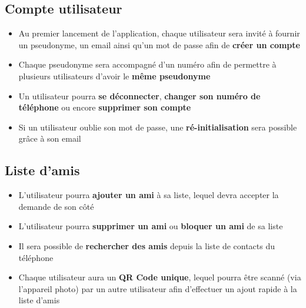 \documentclass[french]{article}
\begin{document}
		\subsection{Compte utilisateur}
			\begin{itemize}
				\item Au premier lancement de l'application, chaque utilisateur sera invité à fournir un pseudonyme, un email ainsi qu'un mot de passe afin de \textbf{créer un compte} 
				\item Chaque pseudonyme sera accompagné d'un numéro afin de permettre à plusieurs utilisateurs d'avoir le \textbf{même pseudonyme}
				\item Un utilisateur pourra \textbf{se déconnecter}, \textbf{changer son numéro de téléphone} ou encore \textbf{supprimer son compte}
				\item Si un utilisateur oublie son mot de passe, une \textbf{ré-initialisation} sera possible grâce à son email
			\end{itemize}
	
		\subsection{Liste d'amis}
			\begin{itemize}
				\item L'utilisateur pourra \textbf{ajouter un ami} à sa liste, lequel devra accepter la demande de son côté
				\item L'utilisateur pourra \textbf{supprimer un ami} ou \textbf{bloquer un ami} de sa liste
				\item Il sera possible de \textbf{rechercher des amis} depuis la liste de contacts du téléphone
				\item Chaque utilisateur aura un \textbf{QR Code unique}, lequel pourra être scanné (via l'appareil photo) par un autre utilisateur afin d'effectuer un ajout rapide à la liste d'amis 
			\end{itemize}
		
\end{document}
